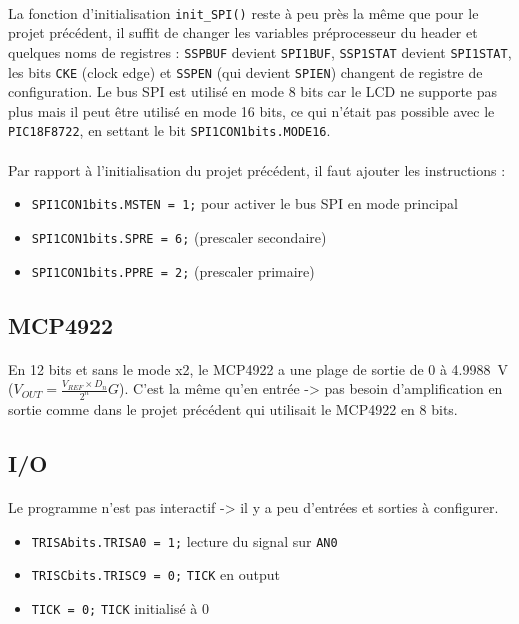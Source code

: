 \documentclass{article}
\begin{document}
    \paragraph{}
    La fonction d'initialisation \texttt{init\_SPI()} reste à peu près la même que pour le projet précédent, il suffit de changer les variables préprocesseur du header et quelques noms de registres : \texttt{SSPBUF} devient \texttt{SPI1BUF}, \texttt{SSP1STAT} devient \texttt{SPI1STAT}, les bits \texttt{CKE} (clock edge) et \texttt{SSPEN} (qui devient \texttt{SPIEN}) changent de registre de configuration. Le bus SPI est utilisé en mode 8 bits car le LCD ne supporte pas plus mais il peut être utilisé en mode 16 bits, ce qui n'était pas possible avec le \texttt{PIC18F8722}, en settant le bit \texttt{SPI1CON1bits.MODE16}.

    \paragraph{}
    Par rapport à l'initialisation du projet précédent, il faut ajouter les instructions :
    \begin{itemize}
        \item \texttt{SPI1CON1bits.MSTEN = 1;} pour activer le bus SPI en mode principal
        \item \texttt{SPI1CON1bits.SPRE = 6;} (prescaler secondaire)
        \item \texttt{SPI1CON1bits.PPRE = 2;} (prescaler primaire)
    \end{itemize}


    \subsection{MCP4922}
    \paragraph{}
    En 12 bits et sans le mode x2, le MCP4922 a une plage de sortie de 0 à \SI{4.9988}{\volt} ($V_{OUT} = \frac{V_{REF} \times D_n}{2^n} G$). C'est la même qu'en entrée -> pas besoin d'amplification en sortie comme dans le projet précédent qui utilisait le MCP4922 en 8 bits.


    \subsection{I/O}
    \paragraph{}
    Le programme n'est pas interactif -> il y a peu d'entrées et sorties à configurer.
    \begin{itemize}
        \item \texttt{TRISAbits.TRISA0 = 1;} lecture du signal sur \texttt{AN0}
        \item \texttt{TRISCbits.TRISC9 = 0;} \texttt{TICK} en output
        \item \texttt{TICK = 0;} \texttt{TICK} initialisé à 0
    \end{itemize}
\end{document}
